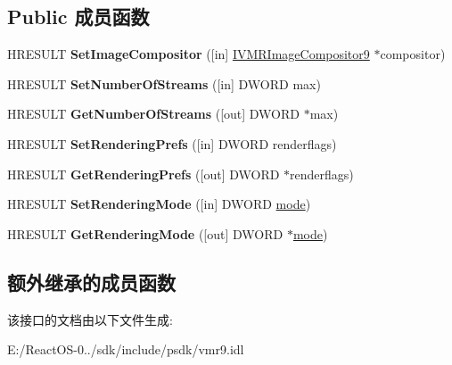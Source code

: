 \subsection*{Public 成员函数}
\begin{DoxyCompactItemize}
\item 
\mbox{\label{interface_i_v_m_r_filter_config9_a8a871d2519c181ba541f07eff1c983bf}} 
H\+R\+E\+S\+U\+LT {\bfseries Set\+Image\+Compositor} (\mbox{[}in\mbox{]} \hyperlink{interface_i_v_m_r_image_compositor9}{I\+V\+M\+R\+Image\+Compositor9} $\ast$compositor)
\item 
\mbox{\label{interface_i_v_m_r_filter_config9_af1ff6916150e45a3fa783ad5d98a4ae0}} 
H\+R\+E\+S\+U\+LT {\bfseries Set\+Number\+Of\+Streams} (\mbox{[}in\mbox{]} D\+W\+O\+RD max)
\item 
\mbox{\label{interface_i_v_m_r_filter_config9_a5359229b25f419f0fb562defdd49541f}} 
H\+R\+E\+S\+U\+LT {\bfseries Get\+Number\+Of\+Streams} (\mbox{[}out\mbox{]} D\+W\+O\+RD $\ast$max)
\item 
\mbox{\label{interface_i_v_m_r_filter_config9_a72820a0883a400ce6199eeb32ea5b7e5}} 
H\+R\+E\+S\+U\+LT {\bfseries Set\+Rendering\+Prefs} (\mbox{[}in\mbox{]} D\+W\+O\+RD renderflags)
\item 
\mbox{\label{interface_i_v_m_r_filter_config9_a04612e7f11c8f9bfd457df42a1d55aef}} 
H\+R\+E\+S\+U\+LT {\bfseries Get\+Rendering\+Prefs} (\mbox{[}out\mbox{]} D\+W\+O\+RD $\ast$renderflags)
\item 
\mbox{\label{interface_i_v_m_r_filter_config9_ac5c5150e1e944830fc464c8402cd2fad}} 
H\+R\+E\+S\+U\+LT {\bfseries Set\+Rendering\+Mode} (\mbox{[}in\mbox{]} D\+W\+O\+RD \hyperlink{interfacevoid}{mode})
\item 
\mbox{\label{interface_i_v_m_r_filter_config9_a718b1832efa5ce7f8794f096348d1a11}} 
H\+R\+E\+S\+U\+LT {\bfseries Get\+Rendering\+Mode} (\mbox{[}out\mbox{]} D\+W\+O\+RD $\ast$\hyperlink{interfacevoid}{mode})
\end{DoxyCompactItemize}
\subsection*{额外继承的成员函数}


该接口的文档由以下文件生成\+:\begin{DoxyCompactItemize}
\item 
E\+:/\+React\+O\+S-\/0../sdk/include/psdk/vmr9.\+idl\end{DoxyCompactItemize}
